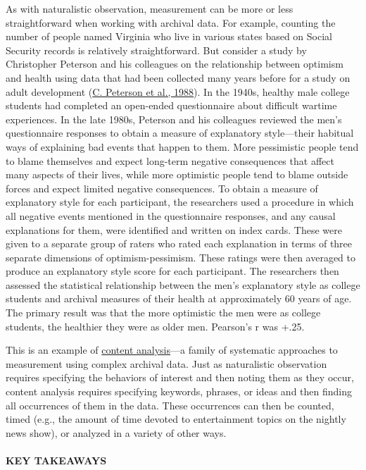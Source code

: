 \documentclass[
]{krantz}
\begin{document}
As with naturalistic observation, measurement can be more or less straightforward when working with archival data. For example, counting the number of people named Virginia who live in various states based on Social Security records is relatively straightforward. But consider a study by Christopher Peterson and his colleagues on the relationship between optimism and health using data that had been collected many years before for a study on adult development (\protect\hyperlink{ref-peterson1988pessimistic}{C. Peterson et al., 1988}). In the 1940s, healthy male college students had completed an open-ended questionnaire about difficult wartime experiences. In the late 1980s, Peterson and his colleagues reviewed the men's questionnaire responses to obtain a measure of explanatory style---their habitual ways of explaining bad events that happen to them. More pessimistic people tend to blame themselves and expect long-term negative consequences that affect many aspects of their lives, while more optimistic people tend to blame outside forces and expect limited negative consequences. To obtain a measure of explanatory style for each participant, the researchers used a procedure in which all negative events mentioned in the questionnaire responses, and any causal explanations for them, were identified and written on index cards. These were given to a separate group of raters who rated each explanation in terms of three separate dimensions of optimism-pessimism. These ratings were then averaged to produce an explanatory style score for each participant. The researchers then assessed the statistical relationship between the men's explanatory style as college students and archival measures of their health at approximately 60 years of age. The primary result was that the more optimistic the men were as college students, the healthier they were as older men. Pearson's r was +.25.

This is an example of \protect\hyperlink{content-analysis}{content analysis}---a family of systematic approaches to measurement using complex archival data. Just as naturalistic observation requires specifying the behaviors of interest and then noting them as they occur, content analysis requires specifying keywords, phrases, or ideas and then finding all occurrences of them in the data. These occurrences can then be counted, timed (e.g., the amount of time devoted to entertainment topics on the nightly news show), or analyzed in a variety of other ways.

\hypertarget{key-takeaways-23}{%
\paragraph*{KEY TAKEAWAYS}\label{key-takeaways-23}}
\end{document}
